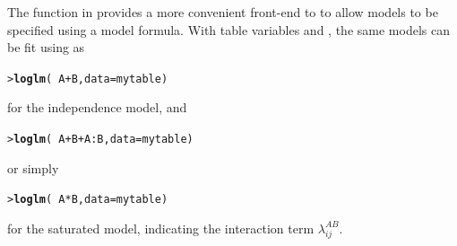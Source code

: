 \documentclass[10pt,krantz2]{krantz}\usepackage[]{graphicx}\usepackage[]{color}
\makeatletter
\newcommand{\hlopt}[1]{\textcolor[rgb]{0,0,0}{#1}}%
\newcommand{\hlstd}[1]{\textcolor[rgb]{0.345,0.345,0.345}{#1}}%
\newcommand{\hlkwc}[1]{\textcolor[rgb]{0.333,0.667,0.333}{#1}}%
\newcommand{\hlkwd}[1]{\textcolor[rgb]{0.737,0.353,0.396}{\textbf{#1}}}%
\newenvironment{kframe}{%
 \def\at@end@of@kframe{}%
 \ifinner\ifhmode%
  \def\at@end@of@kframe{\end{minipage}}%
  \begin{minipage}{\columnwidth}%
 \fi\fi%
 \def\FrameCommand##1{\hskip\@totalleftmargin \hskip-\fboxsep
 \colorbox{shadecolor}{##1}\hskip-\fboxsep
     \hskip-\linewidth \hskip-\@totalleftmargin \hskip\columnwidth}%
 \MakeFramed {\advance\hsize-\width
   \@totalleftmargin\z@ \linewidth\hsize
   \@setminipage}}%
 {\par\unskip\endMakeFramed%
 \at@end@of@kframe}
\newenvironment{knitrout}{}{} %
\renewenvironment{knitrout}{\small\renewcommand{\baselinestretch}{.85}}{} %
\makeatother
\begin{document}
The function  in  provides a more convenient
front-end to 
to allow \loglin models to be specified using a model formula.
With table variables  and , the same models can be
fit using  as
\begin{knitrout}
\color{fgcolor}\begin{kframe}
\begin{alltt}
\hlstd{> }\hlkwd{loglm}\hlstd{(}\hlopt{~} \hlstd{A} \hlopt{+} \hlstd{B,} \hlkwc{data} \hlstd{= mytable)}
\end{alltt}
\end{kframe}
\end{knitrout}
for the independence model, and
\begin{knitrout}
\color{fgcolor}\begin{kframe}
\begin{alltt}
\hlstd{> }\hlkwd{loglm}\hlstd{(}\hlopt{~} \hlstd{A} \hlopt{+} \hlstd{B} \hlopt{+} \hlstd{A} \hlopt{:} \hlstd{B,} \hlkwc{data} \hlstd{= mytable)}
\end{alltt}
\end{kframe}
\end{knitrout}
or simply
\begin{knitrout}
\color{fgcolor}\begin{kframe}
\begin{alltt}
\hlstd{> }\hlkwd{loglm}\hlstd{(}\hlopt{~} \hlstd{A} \hlopt{*} \hlstd{B,} \hlkwc{data} \hlstd{= mytable)}
\end{alltt}
\end{kframe}
\end{knitrout}
for the saturated model,  indicating the interaction term $\lambda_{ij}^{AB}$.
\end{document}
